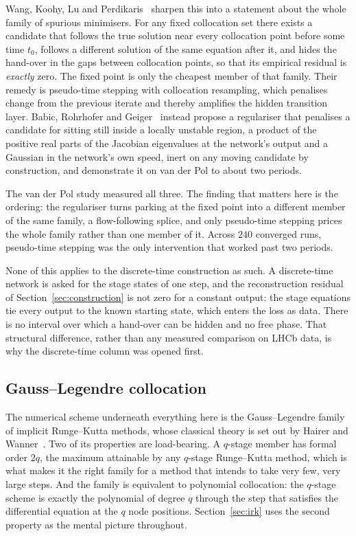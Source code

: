 \documentclass[11pt,a4paper]{article}
\begin{document}
Wang, Koohy, Lu and Perdikaris~\cite{wang2026pseudo} sharpen this into a
statement about the whole family of spurious minimisers. For any fixed
collocation set there exists a candidate that follows the true solution near
every collocation point before some time $t_0$, follows a different solution of
the same equation after it, and hides the hand-over in the gaps between
collocation points, so that its empirical residual is \emph{exactly} zero. The
fixed point is only the cheapest member of that family. Their remedy is
pseudo-time stepping with collocation resampling, which penalises change from
the previous iterate and thereby amplifies the hidden transition layer.
Babic, Rohrhofer and Geiger~\cite{babic2025} instead propose a regulariser that
penalises a candidate for sitting still inside a locally unstable region, a
product of the positive real parts of the Jacobian eigenvalues at the network's
output and a Gaussian in the network's own speed, inert on any moving candidate
by construction, and demonstrate it on van der Pol to about two periods.

The van der Pol study measured all three. The finding that matters here is the
ordering: the regulariser turns parking at the fixed point into a different
member of the same family, a flow-following splice, and only pseudo-time
stepping prices the whole family rather than one member of it. Across $240$
converged runs, pseudo-time stepping was the only intervention that worked past
two periods.

None of this applies to the discrete-time construction as such. A discrete-time
network is asked for the stage states of one step, and the reconstruction
residual of Section~\ref{sec:construction} is not zero for a constant output:
the stage equations tie every output to the known starting state, which enters
the loss as data. There is no interval over which a hand-over can be hidden and
no free phase. That structural difference, rather than any measured comparison
on LHCb data, is why the discrete-time column was opened first.

\subsection{Gauss--Legendre collocation}

The numerical scheme underneath everything here is the Gauss--Legendre family of
implicit Runge--Kutta methods, whose classical theory is set out by Hairer and
Wanner~\cite{hairer1996}. Two of its properties are load-bearing. A $q$-stage
member has formal order $2q$, the maximum attainable by any $q$-stage
Runge--Kutta method, which is what makes it the right family for a method that
intends to take very few, very large steps. And the family is equivalent to
polynomial collocation: the $q$-stage scheme is exactly the polynomial of degree
$q$ through the step that satisfies the differential equation at the $q$ node
positions. Section~\ref{sec:irk} uses the second property as the mental picture
throughout.
\end{document}
